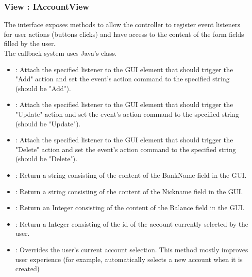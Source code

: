 \documentclass[12pt]{article}
\begin{document}
\subsubsection{View : IAccountView}
The  interface exposes methods to allow the controller to register event listeners for user actions (buttons clicks) and have access to the content of the form fields filled by the user.\\
The callback system uses Java's  class. 
\begin{itemize}
	\item {} : Attach the specified listener to the GUI element that should trigger the "Add" action and set the event's action command to the specified string (should be "Add").
	\item {} : Attach the specified listener to the GUI element that should trigger the "Update" action and set the event's action command to the specified string (should be "Update").
	\item {} : Attach the specified listener to the GUI element that should trigger the "Delete" action and set the event's action command to the specified string (should be "Delete").
	\item {} : Return a string consisting of the content of the BankName field in the GUI.
	\item {} : Return a string consisting of the content of the Nickname field in the GUI.
	\item {} : Return an Integer consisting of the content of the Balance field in the GUI.
	\item {} : Return a Integer consisting of the id of the account currently selected by the user.
	\item {} : Overrides the user's current account selection. This method mostly improves user experience (for example, automatically selects a new account when it is created)
\end{itemize}
\end{document}
